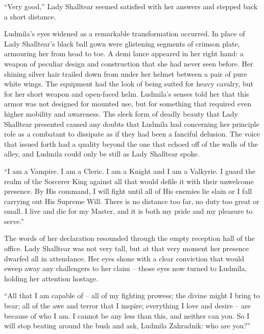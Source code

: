  

“Very good,” Lady Shalltear seemed satisfied with her answers and stepped back a short distance.

 

Ludmila’s eyes widened as a remarkable transformation occurred. In place of Lady Shalltear’s black ball gown were glistening segments of crimson plate, armouring her from head to toe. A demi lance appeared in her right hand: a weapon of peculiar design and construction that she had never seen before. Her shining silver hair trailed down from under her helmet between a pair of pure white wings. The equipment had the look of being suited for heavy cavalry, but for her short weapon and open-faced helm. Ludmila’s senses told her that this armor was not designed for mounted use, but for something that required even higher mobility and awareness. The sleek form of deadly beauty that Lady Shalltear presented caused any doubts that Ludmila had concerning her principle role as a combatant to dissipate as if they had been a fanciful delusion. The voice that issued forth had a quality beyond the one that echoed off of the walls of the alley, and Ludmila could only be still as Lady Shalltear spoke.

 

“I am a Vampire. I am a Cleric. I am a Knight and I am a Valkyrie. I guard the realm of the Sorcerer King against all that would defile it with their unwelcome presence. By His command, I will fight until all of His enemies lie slain or I fall carrying out His Supreme Will. There is no distance too far, no duty too great or small. I live and die for my Master, and it is both my pride and my pleasure to serve.”

 

The words of her declaration resounded through the empty reception hall of the office. Lady Shalltear was not very tall, but at that very moment her presence dwarfed all in attendance. Her eyes shone with a clear conviction that would sweep away any challengers to her claim – those eyes now turned to Ludmila, holding her attention hostage.

 

“All that I am capable of – all of my fighting prowess; the divine might I bring to bear; all of the awe and terror that I inspire; everything I love and desire – are because of who I am. I cannot be any less than this, and neither can you. So I will stop beating around the bush and ask, Ludmila Zahradnik: who are you?”

 

